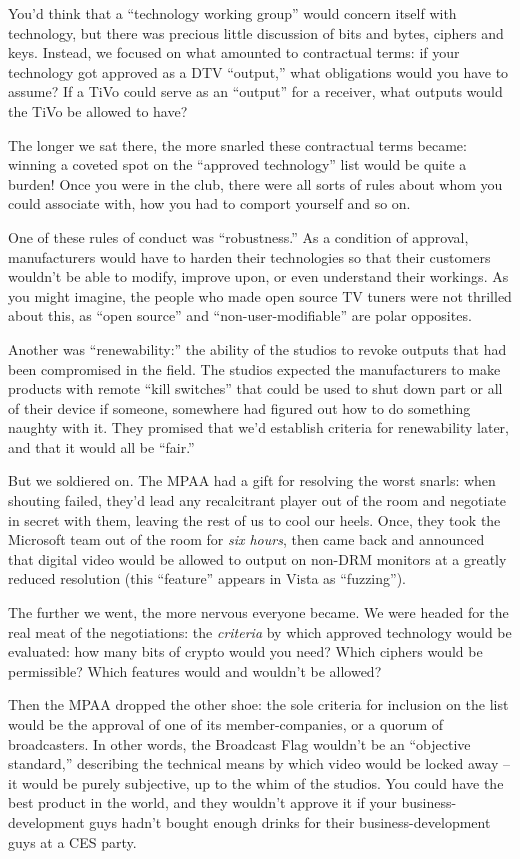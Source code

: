 You'd think that a ``technology working group'' would concern itself
with technology, but there was precious little discussion of bits
and bytes, ciphers and keys. Instead, we focused on what amounted
to contractual terms: if your technology got approved as a DTV
``output,'' what obligations would you have to assume? If a TiVo
could serve as an ``output'' for a receiver, what outputs would the
TiVo be allowed to have?

The longer we sat there, the more snarled these contractual terms
became: winning a coveted spot on the ``approved technology'' list
would be quite a burden! Once you were in the club, there were all
sorts of rules about whom you could associate with, how you had to
comport yourself and so on.

One of these rules of conduct was ``robustness.'' As a condition of
approval, manufacturers would have to harden their technologies so
that their customers wouldn't be able to modify, improve upon, or
even understand their workings. As you might imagine, the people
who made open source TV tuners were not thrilled about this, as
``open source'' and ``non-user-modifiable'' are polar opposites.

Another was ``renewability:'' the ability of the studios to revoke
outputs that had been compromised in the field. The studios
expected the manufacturers to make products with remote ``kill
switches'' that could be used to shut down part or all of their
device if someone, somewhere had figured out how to do something
naughty with it. They promised that we'd establish criteria for
renewability later, and that it would all be ``fair.''

But we soldiered on. The MPAA had a gift for resolving the worst
snarls: when shouting failed, they'd lead any recalcitrant player
out of the room and negotiate in secret with them, leaving the rest
of us to cool our heels. Once, they took the Microsoft team out of
the room for \emph{six hours}, then came back and announced that
digital video would be allowed to output on non-DRM monitors at a
greatly reduced resolution (this ``feature'' appears in Vista as
``fuzzing'').

The further we went, the more nervous everyone became. We were
headed for the real meat of the negotiations: the \emph{criteria}
by which approved technology would be evaluated: how many bits of
crypto would you need? Which ciphers would be permissible? Which
features would and wouldn't be allowed?

Then the MPAA dropped the other shoe: the sole criteria for
inclusion on the list would be the approval of one of its
member-companies, or a quorum of broadcasters. In other words, the
Broadcast Flag wouldn't be an ``objective standard,'' describing the
technical means by which video would be locked away -- it would be
purely subjective, up to the whim of the studios. You could have
the best product in the world, and they wouldn't approve it if your
business-development guys hadn't bought enough drinks for their
business-development guys at a CES party.

